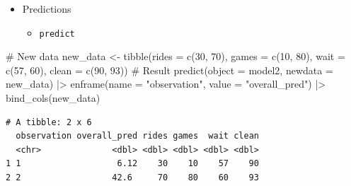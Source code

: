 \documentclass[
  ignorenonframetext,
]{beamer}
\newenvironment{Shaded}{\begin{snugshade}}{\end{snugshade}}
\newcommand{\AttributeTok}[1]{\textcolor[rgb]{0.40,0.45,0.13}{#1}}
\newcommand{\CommentTok}[1]{\textcolor[rgb]{0.37,0.37,0.37}{#1}}
\newcommand{\DecValTok}[1]{\textcolor[rgb]{0.68,0.00,0.00}{#1}}
\newcommand{\FunctionTok}[1]{\textcolor[rgb]{0.28,0.35,0.67}{#1}}
\newcommand{\NormalTok}[1]{\textcolor[rgb]{0.00,0.23,0.31}{#1}}
\newcommand{\OtherTok}[1]{\textcolor[rgb]{0.00,0.23,0.31}{#1}}
\newcommand{\SpecialCharTok}[1]{\textcolor[rgb]{0.37,0.37,0.37}{#1}}
\newcommand{\StringTok}[1]{\textcolor[rgb]{0.13,0.47,0.30}{#1}}
\providecommand{\tightlist}{%
  \setlength{\itemsep}{0pt}\setlength{\parskip}{0pt}}\usepackage{longtable,booktabs,array}
\begin{document}
\begin{frame}[fragile]{}
\label{section-33}
\begin{itemize}
\item
  Predictions

  \begin{itemize}
  \tightlist
  \item
    \texttt{predict}
  \end{itemize}
\end{itemize}

\tiny

\begin{Shaded}
\begin{Highlighting}[]
\CommentTok{\# New data}
\NormalTok{new\_data }\OtherTok{\textless{}{-}} \FunctionTok{tibble}\NormalTok{(}\AttributeTok{rides =} \FunctionTok{c}\NormalTok{(}\DecValTok{30}\NormalTok{, }\DecValTok{70}\NormalTok{),}
                   \AttributeTok{games =} \FunctionTok{c}\NormalTok{(}\DecValTok{10}\NormalTok{, }\DecValTok{80}\NormalTok{),}
                   \AttributeTok{wait =}  \FunctionTok{c}\NormalTok{(}\DecValTok{57}\NormalTok{, }\DecValTok{60}\NormalTok{),}
                   \AttributeTok{clean =} \FunctionTok{c}\NormalTok{(}\DecValTok{90}\NormalTok{, }\DecValTok{93}\NormalTok{))}
\CommentTok{\# Result}
\FunctionTok{predict}\NormalTok{(}\AttributeTok{object =}\NormalTok{ model2, }\AttributeTok{newdata =}\NormalTok{ new\_data) }\SpecialCharTok{|\textgreater{}} 
  \FunctionTok{enframe}\NormalTok{(}\AttributeTok{name =} \StringTok{"observation"}\NormalTok{, }\AttributeTok{value =} \StringTok{"overall\_pred"}\NormalTok{) }\SpecialCharTok{|\textgreater{}}
  \FunctionTok{bind\_cols}\NormalTok{(new\_data)}
\end{Highlighting}
\end{Shaded}

\begin{verbatim}
# A tibble: 2 x 6
  observation overall_pred rides games  wait clean
  <chr>              <dbl> <dbl> <dbl> <dbl> <dbl>
1 1                   6.12    30    10    57    90
2 2                  42.6     70    80    60    93
\end{verbatim}
\end{frame}
\end{document}
